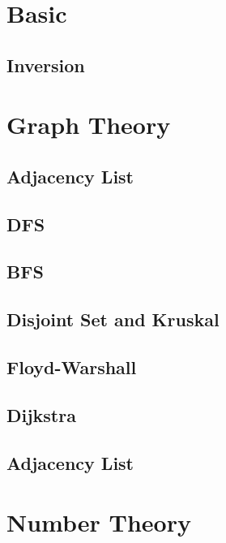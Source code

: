 \section{Basic}
        \subsection{Inversion}
                

\section{Graph Theory}
        \subsection{Adjacency List}
                
        \subsection{DFS}
                
        \subsection{BFS}
                
        \subsection{Disjoint Set and Kruskal}
                
        \subsection{Floyd-Warshall}
                
        \subsection{Dijkstra}
                
        \subsection{Adjacency List}
                

\section{Number Theory}
